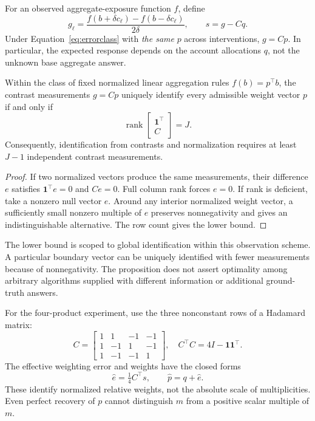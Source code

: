 For an observed aggregate-exposure function $f$, define
\begin{equation}
 g_\ell=\frac{f(b+\delta c_\ell)-f(b-\delta c_\ell)}{2\delta},
 \qquad s=g-Cq.\label{eq:slope}
\end{equation}
Under Equation~\ref{eq:errorclass} with \emph{the same} $p$ across interventions, $g=Cp$. In particular, the expected response depends on the account allocations $q$, not the unknown base aggregate answer.

\begin{proposition}\label{prop:rank}
Within the class of fixed normalized linear aggregation rules $f(b)=p^\top b$, the contrast measurements $g=Cp$ uniquely identify every admissible weight vector $p$ if and only if
\begin{equation}
\operatorname{rank}\begin{bmatrix}\mathbf1^\top\\ C\end{bmatrix}=J.
\end{equation}
Consequently, identification from contrasts and normalization requires at least $J-1$ independent contrast measurements.
\end{proposition}
\begin{proof}
If two normalized vectors produce the same measurements, their difference $e$ satisfies $\mathbf1^\top e=0$ and $Ce=0$. Full column rank forces $e=0$. If rank is deficient, take a nonzero null vector $e$. Around any interior normalized weight vector, a sufficiently small nonzero multiple of $e$ preserves nonnegativity and gives an indistinguishable alternative. The row count gives the lower bound.
\end{proof}
The lower bound is scoped to global identification within this observation scheme. A particular boundary vector can be uniquely identified with fewer measurements because of nonnegativity. The proposition does not assert optimality among arbitrary algorithms supplied with different information or additional ground-truth answers.

For the four-product experiment, use the three nonconstant rows of a Hadamard matrix:
\begin{equation}
C=\begin{bmatrix}
1&1&-1&-1\\1&-1&1&-1\\1&-1&-1&1
\end{bmatrix},\quad
C^\top C=4I-\mathbf1\mathbf1^\top.
\end{equation}
The effective weighting error and weights have the closed forms
\begin{equation}
\widehat e=\tfrac14 C^\top s,\qquad \widehat p=q+\widehat e.\label{eq:reconstruct}
\end{equation}
These identify normalized relative weights, not the absolute scale of multiplicities. Even perfect recovery of $p$ cannot distinguish $m$ from a positive scalar multiple of $m$.

